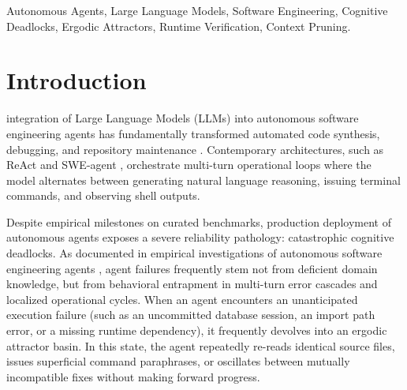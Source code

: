\documentclass[journal]{IEEEtran}
\begin{document}
\begin{IEEEkeywords}
Autonomous Agents, Large Language Models, Software Engineering, Cognitive Deadlocks, Ergodic Attractors, Runtime Verification, Context Pruning.
\end{IEEEkeywords}

\section{Introduction}

 integration of Large Language Models (LLMs) into autonomous software engineering agents has fundamentally transformed automated code synthesis, debugging, and repository maintenance \cite{chen2021codex, jimenez2024swebench, yang2024sweagent}. Contemporary architectures, such as ReAct \cite{yao2023react} and SWE-agent \cite{yang2024sweagent}, orchestrate multi-turn operational loops where the model alternates between generating natural language reasoning, issuing terminal commands, and observing shell outputs. 

Despite empirical milestones on curated benchmarks, production deployment of autonomous agents exposes a severe reliability pathology: catastrophic cognitive deadlocks. As documented in empirical investigations of autonomous software engineering agents \cite{xia2025demystifying}, agent failures frequently stem not from deficient domain knowledge, but from behavioral entrapment in multi-turn error cascades and localized operational cycles. When an agent encounters an unanticipated execution failure (such as an uncommitted database session, an import path error, or a missing runtime dependency), it frequently devolves into an ergodic attractor basin. In this state, the agent repeatedly re-reads identical source files, issues superficial command paraphrases, or oscillates between mutually incompatible fixes without making forward progress.
\end{document}
